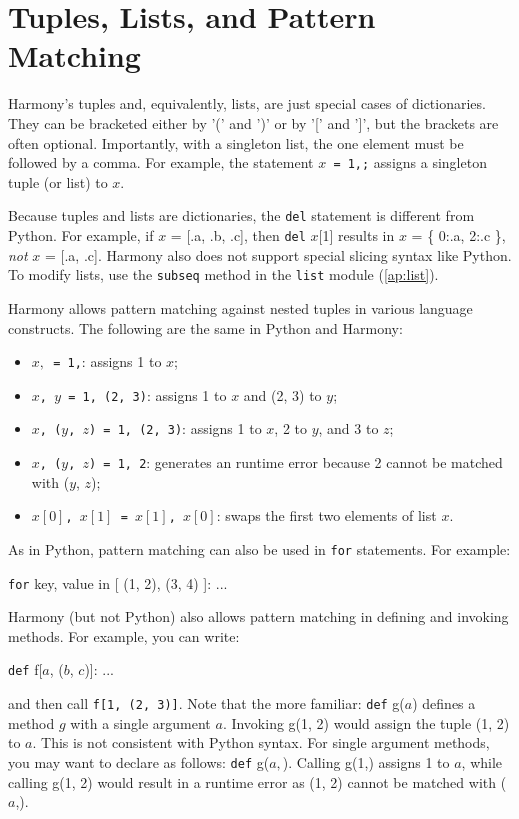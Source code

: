 \documentclass{report}
\newenvironment{code}{
\tcolorbox
}{
\endtcolorbox
}
\begin{document}
\section{Tuples, Lists, and Pattern Matching}

Harmony's tuples and, equivalently, lists, are just special cases of dictionaries.
They can be bracketed either by '(' and ')' or by '[' and ']', but
the brackets are often optional.  Importantly, with a singleton list, the
one element must be followed by a comma.
For example, the statement \texttt{$x$ = 1,;} assigns a singleton tuple (or list) to $x$.

Because tuples and lists are dictionaries, the \texttt{del} statement is
different from Python.  For example, if $x$ = [.a, .b, .c], then
\texttt{del} $x$[1] results in $x$ = \{ 0:.a, 2:.c \}, \emph{not}
$x$ = [.a, .c].
Harmony also does not support special slicing syntax like Python.
To modify lists, use the \texttt{subseq} method in the \texttt{list} module
(\autoref{ap:list}).

Harmony allows pattern matching against nested tuples in various
language constructs.
%
The following are the same in Python and Harmony:
\begin{itemize}
\item \texttt{$x,$ = 1,}: assigns 1 to $x$;
\item \texttt{$x$, $y$ = 1, (2, 3)}: assigns 1 to $x$ and (2, 3) to $y$;
\item \texttt{$x$, ($y$, $z$) = 1, (2, 3)}: assigns 1 to $x$, 2 to $y$, and
3 to $z$;
\item \texttt{$x$, ($y$, $z$) = 1, 2}: generates an runtime error because 2 cannot
be matched with ($y$, $z$);
\item \texttt{$x[0]$, $x[1]$ = $x[1]$, $x[0]$}: swaps the first two elements of list $x$.
\end{itemize}

As in Python, pattern matching can also be used in \texttt{for} statements.
For example:
\begin{code}
\texttt{for} key, value in [ (1, 2), (3, 4) ]:
    ...
\end{code}

Harmony (but not Python)
also allows pattern matching in defining and invoking methods.
For example, you can write:
\begin{code}
\texttt{def} f[$a$, ($b$, $c$)]: ...
\end{code}
and then call \texttt{f[1, (2, 3)]}.
Note that the more familiar: \texttt{def} g($a$) defines a method $g$ with
a single argument $a$.  Invoking g(1, 2) would assign the tuple (1, 2) to
$a$.  This is not consistent with Python syntax.  For single argument methods,
you may want to declare as follows: \texttt{def} g($a,$).
Calling g(1,) assigns 1 to $a$, while calling g(1, 2) would result in a
runtime error as (1, 2) cannot be matched with ($a$,).
\end{document}
